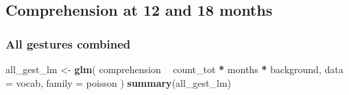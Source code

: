 \documentclass[]{article}
\newenvironment{Shaded}{\begin{snugshade}}{\end{snugshade}}
\newcommand{\DataTypeTok}[1]{\textcolor[rgb]{0.13,0.29,0.53}{#1}}
\newcommand{\KeywordTok}[1]{\textcolor[rgb]{0.13,0.29,0.53}{\textbf{#1}}}
\newcommand{\NormalTok}[1]{#1}
\newcommand{\OperatorTok}[1]{\textcolor[rgb]{0.81,0.36,0.00}{\textbf{#1}}}
\newcommand{\StringTok}[1]{\textcolor[rgb]{0.31,0.60,0.02}{#1}}
\begin{document}
\hypertarget{comprehension-at-12-and-18-months}{%
\subsection{Comprehension at 12 and 18
months}\label{comprehension-at-12-and-18-months}}

\hypertarget{all-gestures-combined}{%
\subsubsection{All gestures combined}\label{all-gestures-combined}}

\begin{Shaded}
\begin{Highlighting}[]
\NormalTok{all_gest_lm <-}\StringTok{ }\KeywordTok{glm}\NormalTok{(}
\NormalTok{  comprehension }\OperatorTok{~}
\StringTok{    }\NormalTok{count_tot }\OperatorTok{*}
\StringTok{    }\NormalTok{months }\OperatorTok{*}
\StringTok{    }\NormalTok{background,}
  \DataTypeTok{data =}\NormalTok{ vocab,}
  \DataTypeTok{family =}\NormalTok{ poisson}
\NormalTok{)}
\KeywordTok{summary}\NormalTok{(all_gest_lm)}
\end{Highlighting}
\end{Shaded}
\end{document}
